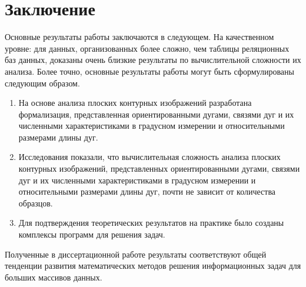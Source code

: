 \chapter*{Заключение}						%

Основные результаты работы заключаются в следующем. 
На качественном уровне: для данных, организованных более сложно, чем  таблицы реляционных баз данных, доказаны очень близкие результаты по вычислительной сложности их анализа.
Более точно, основные результаты работы могут быть сформулированы следующим образом.
\begin{enumerate}
\item На основе анализа плоских контурных изображений разработана формализация, представленная ориентированными дугами, связями дуг и их численными характеристиками в градусном измерении и  относительными размерами  длины дуг.
\item Исследования показали, что вычислительная сложность  анализа плоских контурных изображений, представленных ориентированными дугами, связями дуг и их численными характеристиками в градусном измерении и  относительными размерами  длины дуг, почти не зависит от количества образцов.
\item Для подтверждения теоретических результатов на практике  было созданы комплексы программ для решения задач.
\end{enumerate}

Полученные в диссертационной работе результаты соответствуют общей
тенденции развития математических методов решения информационных задач для больших массивов данных.

\clearpage